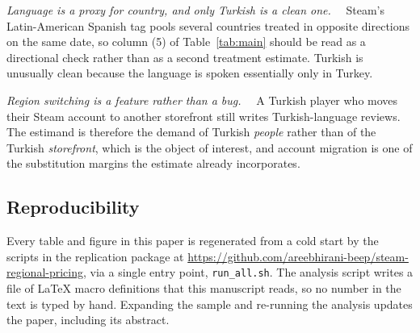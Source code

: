 \documentclass[11pt]{article}
\newcommand{\heading}[1]{\vspace{3pt}\noindent\textit{#1}\ \ }
\begin{document}
\heading{Language is a proxy for country, and only Turkish is a clean one.} Steam's Latin-American
Spanish tag pools several countries treated in opposite directions on the same date, so column (5)
of Table~\ref{tab:main} should be read as a directional check rather than as a second treatment
estimate. Turkish is unusually clean because the language is spoken essentially only in Turkey.

\heading{Region switching is a feature rather than a bug.} A Turkish player who moves their Steam
account to another storefront still writes Turkish-language reviews. The estimand is therefore the
demand of Turkish \emph{people} rather than of the Turkish \emph{storefront}, which is the object of
interest, and account migration is one of the substitution margins the estimate already
incorporates.

\subsection*{Reproducibility}

Every table and figure in this paper is regenerated from a cold start by the scripts in the
replication package at \url{https://github.com/areebhirani-beep/steam-regional-pricing}, via a single entry point, \texttt{run\_all.sh}. The analysis script writes a file of \LaTeX{} macro definitions that this
manuscript reads, so no number in the text is typed by hand. Expanding the sample and re-running the
analysis updates the paper, including its abstract.

\newpage
\singlespacing

\end{document}
